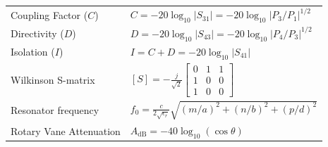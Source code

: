 \documentclass[12pt,a4paper]{article}
\renewcommand{\arraystretch}{1.45}
\begin{document}
\begin{tcolorbox}[formulabox, title={\textbf{Key Formulas at a Glance}}]
\renewcommand{\arraystretch}{1.3}
\begin{tabularx}{\linewidth}{B{4.5cm} X}Coupling Factor ($C$)   & $C = -20 \log_{10} |S_{31}| = -20 \log_{10} |P_3/P_1|^{1/2}$ \\[4pt]
Directivity ($D$)       & $D = -20 \log_{10} |S_{43}| = -20 \log_{10} |P_4/P_3|^{1/2}$ \\[4pt]
Isolation ($I$)         & $I = C + D = -20 \log_{10} |S_{41}|$ \\[4pt]
Wilkinson S-matrix      & $[S] = -\frac{j}{\sqrt{2}} \begin{bmatrix} 0 & 1 & 1 \\ 1 & 0 & 0 \\ 1 & 0 & 0 \end{bmatrix}$ \\[4pt]
Resonator frequency     & $f_0 = \frac{c}{2\sqrt{\epsilon_r}} \sqrt{(m/a)^2 + (n/b)^2 + (p/d)^2}$ \\[4pt]
Rotary Vane Attenuation & $A_{\text{dB}} = -40 \log_{10}(\cos\theta)$
\end{tabularx}
\end{tcolorbox}
\end{document}
